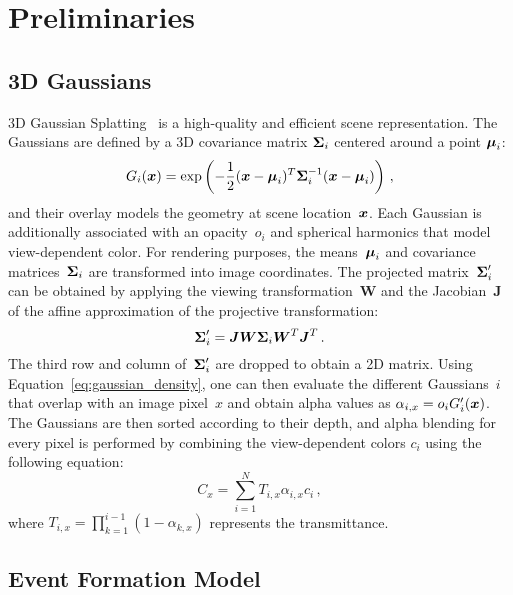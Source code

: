 

\section{Preliminaries}\label{sec:Preliminaries} 

\subsection{3D Gaussians}
3D Gaussian Splatting~\cite{3dgs} is a high-quality and efficient scene representation. 
The Gaussians are defined by a 3D covariance matrix \(\boldsymbol{\Sigma}_i\) centered around a point \(\boldsymbol{\mu}_i\): 
\begin{equation}
   G_i(\boldsymbol{x}) = \exp\left(-\frac{1}{2}(\boldsymbol{x} - \boldsymbol{\mu}_i)^T \boldsymbol{\Sigma}_i^{-1} (\boldsymbol{x} - \boldsymbol{\mu}_i)\right) \mathrm{\,,}
   \label{eq:gaussian_density}
\end{equation}
and their overlay models the 
geometry at scene location~$\boldsymbol{x}$.
Each Gaussian is additionally associated with an opacity~$o_i$ and spherical harmonics that model view-dependent color.
For rendering purposes, the means~$\boldsymbol{\mu}_i$ and covariance matrices~$\boldsymbol{\Sigma}_i$ are transformed into image coordinates. The projected matrix~$\boldsymbol{\Sigma}'_i$ can be obtained by applying the viewing transformation~$\boldsymbol{W}$ and the Jacobian~$\boldsymbol{J}$ of the affine approximation of the projective transformation:
\begin{equation}
   \boldsymbol{\Sigma}'_i = \boldsymbol{J} \boldsymbol{W} \boldsymbol{\Sigma}_i \boldsymbol{W}^T \boldsymbol{J}^T \mathrm{\,.}
   \label{eq:gaussian_project}
\end{equation}
The third row and column of~$\boldsymbol{\Sigma}'_i$ are dropped to obtain a 2D matrix.
Using Equation~\ref{eq:gaussian_density}, one can then evaluate the different Gaussians~$i$ that overlap with an image pixel~$x$ and obtain alpha values as \(\alpha_{i,x} = o_i G'_i(\boldsymbol{x})  \). 
The Gaussians are then sorted according to their depth, and alpha blending for every pixel  is performed by combining the view-dependent colors $c_i$ using the following equation:
\begin{equation}
   C_x = \sum_{i=1}^{N} T_{i,x} \alpha_{i,x} c_i \mathrm{\,,}
\end{equation}
where \(T_{i,x} = \prod_{k=1}^{i-1} (1 - \alpha_{k, x})\) represents the transmittance. 

\subsection{Event Formation Model}

